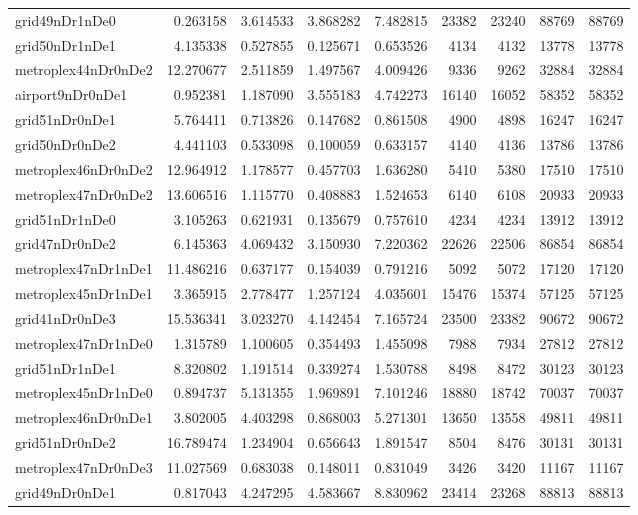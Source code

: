 \begin{longtable}{|l|r|r|r|r|r|r|r|r|}
grid49nDr1nDe0 & 0.263158 & 3.614533 & 3.868282 & 7.482815 & 23382 & 23240 & 88769 & 88769 \\
grid50nDr1nDe1 & 4.135338 & 0.527855 & 0.125671 & 0.653526 & 4134 & 4132 & 13778 & 13778 \\
metroplex44nDr0nDe2 & 12.270677 & 2.511859 & 1.497567 & 4.009426 & 9336 & 9262 & 32884 & 32884 \\
airport9nDr0nDe1 & 0.952381 & 1.187090 & 3.555183 & 4.742273 & 16140 & 16052 & 58352 & 58352 \\
grid51nDr0nDe1 & 5.764411 & 0.713826 & 0.147682 & 0.861508 & 4900 & 4898 & 16247 & 16247 \\
grid50nDr0nDe2 & 4.441103 & 0.533098 & 0.100059 & 0.633157 & 4140 & 4136 & 13786 & 13786 \\
metroplex46nDr0nDe2 & 12.964912 & 1.178577 & 0.457703 & 1.636280 & 5410 & 5380 & 17510 & 17510 \\
metroplex47nDr0nDe2 & 13.606516 & 1.115770 & 0.408883 & 1.524653 & 6140 & 6108 & 20933 & 20933 \\
grid51nDr1nDe0 & 3.105263 & 0.621931 & 0.135679 & 0.757610 & 4234 & 4234 & 13912 & 13912 \\
grid47nDr0nDe2 & 6.145363 & 4.069432 & 3.150930 & 7.220362 & 22626 & 22506 & 86854 & 86854 \\
metroplex47nDr1nDe1 & 11.486216 & 0.637177 & 0.154039 & 0.791216 & 5092 & 5072 & 17120 & 17120 \\
metroplex45nDr1nDe1 & 3.365915 & 2.778477 & 1.257124 & 4.035601 & 15476 & 15374 & 57125 & 57125 \\
grid41nDr0nDe3 & 15.536341 & 3.023270 & 4.142454 & 7.165724 & 23500 & 23382 & 90672 & 90672 \\
metroplex47nDr1nDe0 & 1.315789 & 1.100605 & 0.354493 & 1.455098 & 7988 & 7934 & 27812 & 27812 \\
grid51nDr1nDe1 & 8.320802 & 1.191514 & 0.339274 & 1.530788 & 8498 & 8472 & 30123 & 30123 \\
metroplex45nDr1nDe0 & 0.894737 & 5.131355 & 1.969891 & 7.101246 & 18880 & 18742 & 70037 & 70037 \\
metroplex46nDr0nDe1 & 3.802005 & 4.403298 & 0.868003 & 5.271301 & 13650 & 13558 & 49811 & 49811 \\
grid51nDr0nDe2 & 16.789474 & 1.234904 & 0.656643 & 1.891547 & 8504 & 8476 & 30131 & 30131 \\
metroplex47nDr0nDe3 & 11.027569 & 0.683038 & 0.148011 & 0.831049 & 3426 & 3420 & 11167 & 11167 \\
grid49nDr0nDe1 & 0.817043 & 4.247295 & 4.583667 & 8.830962 & 23414 & 23268 & 88813 & 88813 \\

\end{longtable}
